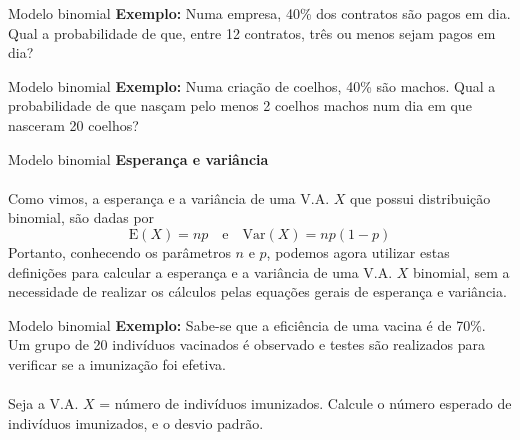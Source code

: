 \documentclass[10pt]{beamer}\usepackage[]{graphicx}\usepackage[]{color}
\providecommand{\E}{\text{E}}
\providecommand{\Var}{\text{Var}}
\theoremstyle{definition}
\begin{document}
\begin{frame}[fragile]{Modelo binomial}
  \textbf{Exemplo:} Numa empresa, 40\% dos contratos são pagos em
  dia. Qual a probabilidade de que, entre 12 contratos, três ou menos
  sejam pagos em dia?
\end{frame}

\begin{frame}[fragile]{Modelo binomial}
  \textbf{Exemplo:} Numa criação de coelhos, 40\% são machos. Qual a
  probabilidade de que nasçam pelo menos 2 coelhos machos num dia em que
  nasceram 20 coelhos?
\end{frame}

\begin{frame}[fragile]{Modelo binomial}
  \textbf{Esperança e variância} \\~\\
  Como vimos, a esperança e a variância de uma V.A. $X$ que possui
  distribuição binomial, são dadas por
  \begin{equation*}
    \E(X) = np \quad \text{e} \quad \Var(X) = np(1-p)
  \end{equation*}
  Portanto, conhecendo os parâmetros $n$ e $p$, podemos agora utilizar
  estas definições para calcular a esperança e a variância de uma
  V.A. $X$ binomial, sem a necessidade de realizar os cálculos pelas
  equações gerais de esperança e variância.
\end{frame}

\begin{frame}[fragile]{Modelo binomial}
  \textbf{Exemplo:} Sabe-se que a eficiência de uma vacina é de 70\%. Um
  grupo de 20 indivíduos vacinados é observado e testes são realizados
  para verificar se a imunização foi efetiva.\\~\\
  Seja a V.A. $X$ = número de indivíduos imunizados. Calcule o número
  esperado de indivíduos imunizados, e o desvio padrão.
\end{frame}



\end{document}
